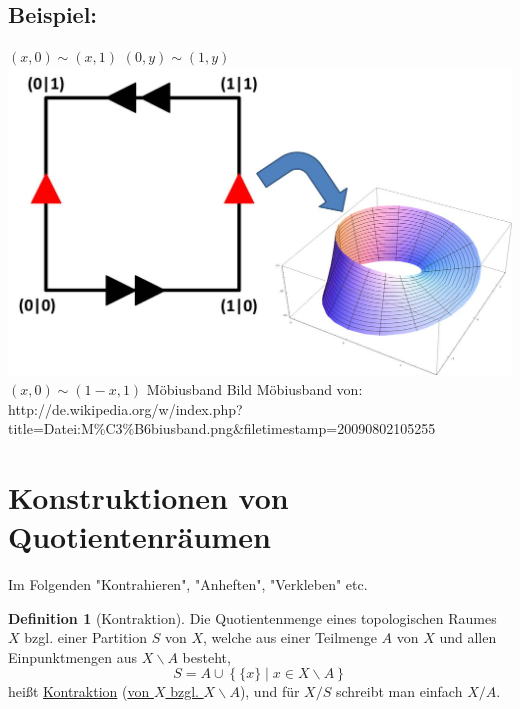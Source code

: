 \documentclass[a4paper,11pt,notitlepage]{report}
\theoremstyle{remark}
\theoremstyle{definition}
\newtheorem{definition}{Definition}[chapter]
\newenvironment{bsp}[1]
{
\setlength{\fboxsep}{10pt}
\subsection*{Beispiel: #1}
\begin{upshape}
}
{
\end{upshape}
}
\begin{document}
\begin{bsp}{}
	$(x,0) \sim (x,1)$
	\newline
	$(0,y) \sim (1,y)$
	\newline
	\includegraphics[scale=0.6]{images/Quotient_Moebius.jpg}\newline
	$(x,0) \sim (1-x,1)$
	\newline Möbiusband \newline
	\scriptsize{Bild Möbiusband von:\\ http://de.wikipedia.org/w/index.php?title=Datei:M\%C3\%B6biusband.png\&filetimestamp=20090802105255}
\end{bsp}


\newpage
\section{Konstruktionen von Quotientenräumen}
Im Folgenden "Kontrahieren", "Anheften", "Verkleben" etc.

\begin{definition}[Kontraktion]
	Die Quotientenmenge eines topologischen Raumes $X$ bzgl. einer Partition $S$ von $X$, welche aus einer Teilmenge $A$ von $X$ und allen Einpunktmengen aus $X \backslash A$ besteht, $$S = A \cup \left\{\{x\} \mid x \in X \backslash A\right \}$$
	heißt \underline{Kontraktion} (\underline{von $X$ bzgl. $X \backslash A$}), und für $X/S$ schreibt man einfach $X/A$.
\end{definition}
\end{document}
